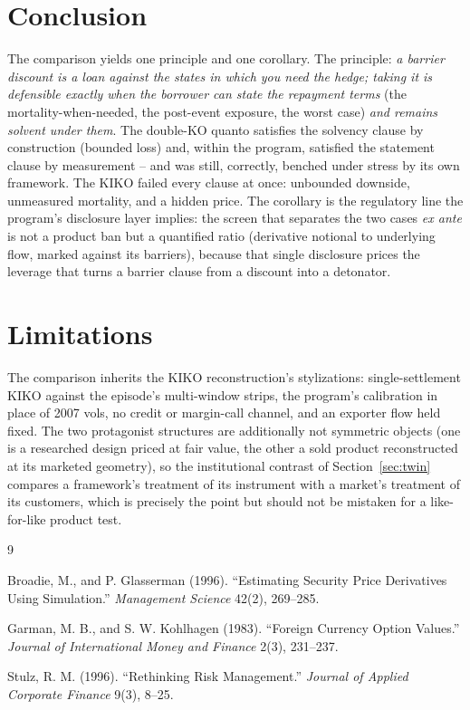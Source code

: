 \documentclass[11pt,a4paper]{article}
\begin{document}
\section{Conclusion}
\label{sec:conclusion}

The comparison yields one principle and one corollary. The principle: \emph{a barrier discount is a loan against the states in which you need the hedge; taking it is defensible exactly when the borrower can state the repayment terms} (the mortality-when-needed, the post-event exposure, the worst case) \emph{and remains solvent under them}. The double-KO quanto satisfies the solvency clause by construction (bounded loss) and, within the program, satisfied the statement clause by measurement -- and was still, correctly, benched under stress by its own framework. The KIKO failed every clause at once: unbounded downside, unmeasured mortality, and a hidden price. The corollary is the regulatory line the program's disclosure layer implies: the screen that separates the two cases \emph{ex ante} is not a product ban but a quantified ratio (derivative notional to underlying flow, marked against its barriers), because that single disclosure prices the leverage that turns a barrier clause from a discount into a detonator.

\section{Limitations}
\label{sec:limits}

The comparison inherits the KIKO reconstruction's stylizations: single-settlement KIKO against the episode's multi-window strips, the program's calibration in place of 2007 vols, no credit or margin-call channel, and an exporter flow held fixed. The two protagonist structures are additionally not symmetric objects (one is a researched design priced at fair value, the other a sold product reconstructed at its marketed geometry), so the institutional contrast of Section~\ref{sec:twin} compares a framework's treatment of its instrument with a market's treatment of its customers, which is precisely the point but should not be mistaken for a like-for-like product test.

\begin{thebibliography}{9}

 Broadie, M., and P. Glasserman (1996). ``Estimating Security Price Derivatives Using Simulation.'' \emph{Management Science} 42(2), 269--285.

 Garman, M. B., and S. W. Kohlhagen (1983). ``Foreign Currency Option Values.'' \emph{Journal of International Money and Finance} 2(3), 231--237.

 Stulz, R. M. (1996). ``Rethinking Risk Management.'' \emph{Journal of Applied Corporate Finance} 9(3), 8--25.

\end{thebibliography}
\end{document}
